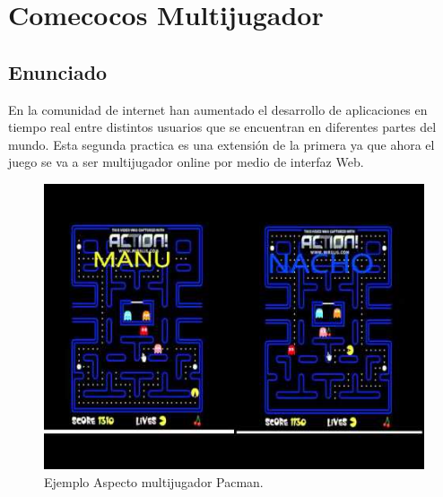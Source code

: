 \chapter{Comecocos Multijugador}
\section{Enunciado}
En la comunidad de internet han aumentado el desarrollo de aplicaciones en tiempo real entre distintos usuarios que se encuentran en diferentes partes del mundo.
Esta segunda practica es una extensión de la primera ya que ahora el juego se va a ser multijugador online por medio de interfaz Web.
\begin{figure}[!h]
\begin{center}
  \includegraphics[width=0.5\linewidth]{Figures/introMultiplayer}
	\decoRule
	\caption[Ejemplo Aspecto multijugador Pacman]{Ejemplo Aspecto multijugador Pacman.}
\label{fig:Pacman_Intro2}
\end{center}
\end{figure}

